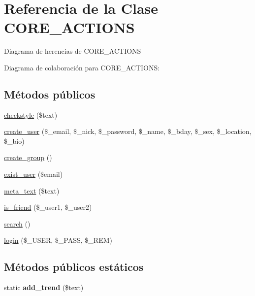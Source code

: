 \hypertarget{class_c_o_r_e___a_c_t_i_o_n_s}{\section{Referencia de la Clase C\-O\-R\-E\-\_\-\-A\-C\-T\-I\-O\-N\-S}
\label{class_c_o_r_e___a_c_t_i_o_n_s}
}


Diagrama de herencias de C\-O\-R\-E\-\_\-\-A\-C\-T\-I\-O\-N\-S


Diagrama de colaboración para C\-O\-R\-E\-\_\-\-A\-C\-T\-I\-O\-N\-S\-:
\subsection*{Métodos públicos}
\begin{DoxyCompactItemize}
\item 
\hyperlink{class_c_o_r_e___a_c_t_i_o_n_s_acb2ef1151b92920b065d417ba6457af9}{checkstyle} (\$text)
\item 
\hyperlink{class_c_o_r_e___a_c_t_i_o_n_s_ab672d86d8a4a35c88f5dc9b5fe58a363}{create\-\_\-user} (\$\-\_\-email, \$\-\_\-nick, \$\-\_\-password, \$\-\_\-name, \$\-\_\-bday, \$\-\_\-sex, \$\-\_\-location, \$\-\_\-bio)
\item 
\hyperlink{class_c_o_r_e___a_c_t_i_o_n_s_a8d6229c412d1772ae355df3ea7a8c7c1}{create\-\_\-group} ()
\item 
\hyperlink{class_c_o_r_e___a_c_t_i_o_n_s_af5353bd19166d507ea0c767d075e41b9}{exist\-\_\-user} (\$email)
\item 
\hyperlink{class_c_o_r_e___a_c_t_i_o_n_s_ae9627d43dbd27db363e9798a228d0455}{meta\-\_\-text} (\$text)
\item 
\hyperlink{class_c_o_r_e___a_c_t_i_o_n_s_a1fdc054f6c0789457f61df1fc6c0a531}{is\-\_\-friend} (\$\-\_\-user1, \$\-\_\-user2)
\item 
\hyperlink{class_c_o_r_e___a_c_t_i_o_n_s_a796bf438724e047aeef18579732a3780}{search} ()
\item 
\hyperlink{class_c_o_r_e___a_c_t_i_o_n_s_aeafe88ea68eb9de27be7e4d37ce621a0}{login} (\$\-\_\-\-U\-S\-E\-R, \$\-\_\-\-P\-A\-S\-S, \$\-\_\-\-R\-E\-M)
\end{DoxyCompactItemize}
\subsection*{Métodos públicos estáticos}
\begin{DoxyCompactItemize}
\item 
\hypertarget{class_c_o_r_e___a_c_t_i_o_n_s_a2fd42f9fb80794cdd17af79f51427027}{static {\bfseries add\-\_\-trend} (\$text)}\label{class_c_o_r_e___a_c_t_i_o_n_s_a2fd42f9fb80794cdd17af79f51427027}

\end{DoxyCompactItemize}


